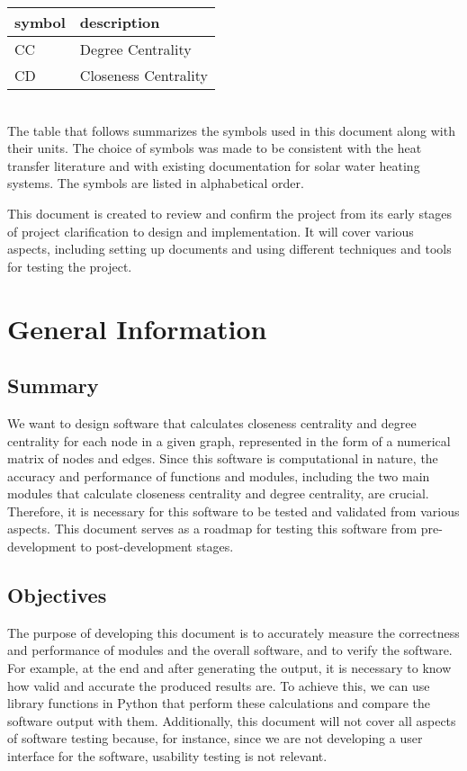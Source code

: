 \documentclass[12pt, titlepage]{article}
\begin{document}
\renewcommand{\arraystretch}{1.2}
\begin{tabular}{l l} 
  \toprule		
  \textbf{symbol} & \textbf{description}\\
  \midrule 
  CC& Degree Centrality \\
  CD& Closeness Centrality  \\
  \bottomrule
\end{tabular}\\

The table that follows summarizes the symbols used in this document along with their
units. The choice of symbols was made to be consistent with the heat transfer literature
and with existing documentation for solar water heating systems. The symbols are listed in
alphabetical order.

\newpage



This document is created to review and confirm the project from its early stages of project clarification to design and implementation. It will cover various aspects, including setting up documents and using different techniques and tools for testing the project.

\section{General Information}

\subsection{Summary}

We want to design software that calculates closeness centrality and degree centrality for each node in a given graph, represented in the form of a numerical matrix of nodes and edges. Since this software is computational in nature, the accuracy and performance of functions and modules, including the two main modules that calculate closeness centrality and degree centrality, are crucial. Therefore, it is necessary for this software to be tested and validated from various aspects. This document serves as a roadmap for testing this software from pre-development to post-development stages.
\subsection{Objectives}

The purpose of developing this document is to accurately measure the correctness and performance of modules and the overall software, and to verify the software. For example, at the end and after generating the output, it is necessary to know how valid and accurate the produced results are. To achieve this, we can use library functions in Python that perform these calculations and compare the software output with them. Additionally, this document will not cover all aspects of software testing because, for instance, since we are not developing a user interface for the software, usability testing is not relevant.
\end{document}
